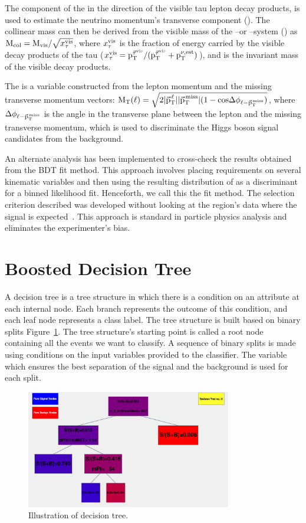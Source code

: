 The component of the \ptvecmiss in the direction of the visible tau lepton decay products, is used to estimate the neutrino momentum's transverse component (\ptnu). The collinear mass can then be derived from the visible mass of the \Pgm--\Pgt or \Pe--\Pgt system (\mvis) as $\text{M}_{\text{col}} = \text{M}_{\text{vis}}/\sqrt{x_\tau^{\text{vis}}}$, where $x_\tau^{\text{vis}}$ is the fraction of energy carried by the visible decay products of the tau ($x_\tau^{\text{vis}} = \text{p}_\text{T}^{\vec{\tau}^{\text{vis}}}/(\text{p}_\text{T}^{\vec{\tau}^{\text{vis}}} + \text{p}_\text{T}^{\nu,\text{est}})$), and \mvis is the invariant mass of the visible decay products.

The \mtl is a variable constructed from the lepton momentum and the missing transverse momentum vectors: $\text{M}_\mathrm{T}(\ell) = \sqrt{2\lvert{\vec{\text{p}}}_{\mathrm{T}}^{\kern1pt\ell}\rvert\lvert{\vec{\text{p}}}_{\mathrm{T}}^{\kern1pt\text{miss}}\rvert (1-\text{cos}\Delta\phi_{\ell-{\vec{\text{p}}}_{\mathrm{T}}^{\kern1pt\text{miss}}})}$, where $\Delta\phi_{\ell-{\vec{\text{p}}}_{\mathrm{T}}^{\kern1pt\text{miss}}}$ is the angle in the transverse plane between the lepton and the missing transverse momentum, which is used to discriminate the Higgs boson signal candidates from the \wjets background.

An alternate analysis has been implemented to cross-check the results obtained from the BDT fit method. This approach involves placing requirements on several kinematic variables and then using the resulting distribution of \mcol as a discriminant for a binned likelihood fit. Henceforth, we call this the \mcol fit method. The selection criterion described was developed without looking at the region's data where the signal is expected~\cite{Roodman:2003rw}. This approach is standard in particle physics analysis and eliminates the experimenter's bias.

\section{Boosted Decision Tree}
\label{bdt}
A decision tree is a tree structure in which there is a condition on an attribute at each internal node. Each branch represents the outcome of this condition, and each leaf node represents a class label. The tree structure is built based on binary splits Figure~\ref{fig:dec_tree}. The tree structure's starting point is called a root node containing all the events we want to classify. A sequence of binary splits is made using conditions on the input variables provided to the classifier. The variable which ensures the best separation of the signal and the background is used for each split.

\begin{figure}[htbp]
  \centering
  \includegraphics[width=0.8\textwidth]{plots/chapter6/BDT/BDT.png}
  \caption{Illustration of decision tree.}
  \label{fig:dec_tree}
\end{figure}

